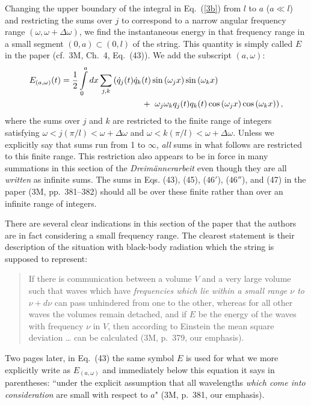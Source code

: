 \documentclass{elsart}
\begin{document}
Changing the upper boundary  of the integral in Eq.\ (\ref{3b}) from $l$ to $a$ ($a \ll l$) and restricting the sums over $j$ to correspond to a narrow angular frequency range $(\omega, \omega + \Delta \omega)$, we find the instantaneous energy in that frequency range in a small segment $(0, a) \subset (0, l)$ of the string. This quantity is simply called $E$ in the paper (cf.\ 3M, Ch.\ 4, Eq.\ (43)). We add the subscript $(a, \omega)$:  
\begin{eqnarray}
\lefteqn{ E_{(a, \omega)}(t) = \frac{1}{2} \int_0^a dx \sum_{j,k}  \left(  \dot{q}_j(t) \dot{q}_k(t) 
\sin{(\omega_j x)} \sin{(\omega_k x)} \right.  } \nonumber \\
 & & \;\;\;\;\;\;\;\;\;  \;\;\;\;\;\;\;\;\; \;\;\;\;\;\;\;\;\; \;\;\;\;\;\;\;\;\;  \;\;\;\;\;\;\;\;\; \left.
 + \;\;  \omega_j \omega_k q_j(t) q_k(t) \cos{(\omega_j x)} \cos{(\omega_k x)} \right),
\label{5}
\end{eqnarray} 
where the sums over $j$ and $k$ are restricted to the finite range of integers satisfying $\omega < j (\pi/l) < \omega+\Delta\omega$ and $ \omega < k (\pi/l) < \omega+\Delta\omega$. Unless we explicitly say that sums run from 1 to $\infty$, {\it all} sums in what follows are restricted to this finite range. This restriction also appears to be in force in many summations in this section of the {\it Dreim\"annerarbeit} even though they are all {\it written} as infinite sums. The sums in Eqs. (43), (45), ($46'$), ($46''$), and (47) in the paper (3M, pp.\ 381--382) should all be over these finite rather than over an infinite range of integers.

There are several clear indications in this section of the paper that the authors are in fact considering a small frequency range. The clearest statement is their description of the situation with black-body radiation which the string is supposed to represent:
\begin{quotation}
If there is communication between a volume $V$ and a very large volume such that waves which have {\it frequencies which lie within a small range $\nu$ to $\nu + d\nu$} can pass unhindered from one to the other, whereas for all other waves the volumes remain detached, and if $E$ be the energy of the waves with frequency $\nu$ in $V$, then according to Einstein the mean square deviation \ldots
can be calculated (3M, p.\ 379, our emphasis).
\end{quotation}
Two pages later, in Eq.\ (43) the same symbol $E$ is used for what we more explicitly write as $E_{(a, \omega)}$ and immediately below this equation it says in parentheses:  ``under the explicit assumption that all wavelengths {\it which come into consideration} are small with respect to $a$" (3M, p.\ 381, our emphasis). 
\end{document}
